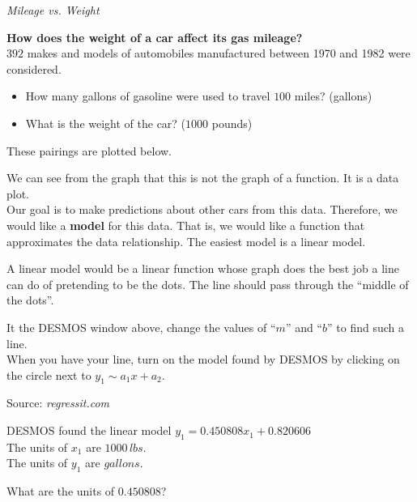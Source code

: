\documentclass{ximera}
\begin{document}
\begin{model} \textit{Mileage vs. Weight}

\textbf{How does the weight of a car affect its gas mileage?} \\



$392$ makes and models of automobiles manufactured between 1970 and 1982 were considered.  

\begin{itemize}
\item How many gallons of gasoline were used to travel $100$ miles?   (gallons)
\item What is the weight of the car?    ($1000$ pounds)
\end{itemize}


These pairings are plotted below.




\begin{center}
\end{center}


We can see from the graph that this is not the graph of a function.  It is a data plot.\\


Our goal is to make predictions about other cars from this data.  Therefore, we would like a \textbf{model} for this data.  That is, we would like a function that approximates the data relationship.  The easiest model is a linear model.


A linear model would be a linear function whose graph does the best job a line can do of pretending to be the dots.  The line should pass through the ``middle of the dots''.

It the DESMOS window above, change the values of ``$m$'' and ``$b$'' to find such a line. \\

When you have your line, turn on the model found by DESMOS by clicking on the circle next to $y_1 \sim a_1 x + a_2$.


Source:   \textit{regressit.com}
\end{model}



\begin{question}


DESMOS found the linear model $y_1 = 0.450808 x_1 + 0.820606$ \\


The units of $x_1$ are $1000 \, lbs$. \\
The units of $y_1$ are $gallons$.



What are the units of $0.450808$?

\begin{multipleChoice}
\end{multipleChoice}


\end{question}
\end{document}
